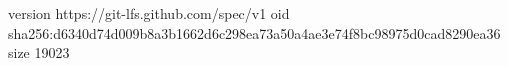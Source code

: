 version https://git-lfs.github.com/spec/v1
oid sha256:d6340d74d009b8a3b1662d6c298ea73a50a4ae3e74f8bc98975d0cad8290ea36
size 19023
